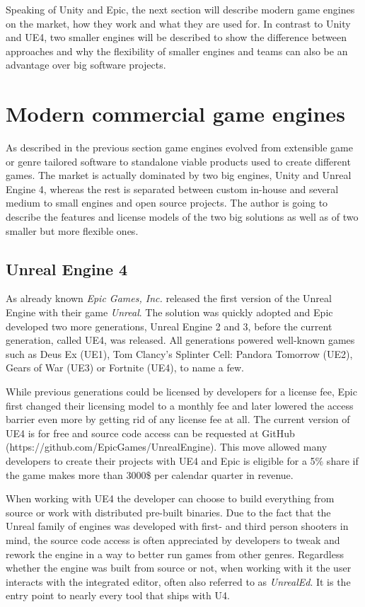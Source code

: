 Speaking of Unity and Epic, the next section will describe modern game engines on the market, how they work and what they are used for. In contrast to Unity and \acl{UE4}, two smaller engines will be described to show the difference between approaches and why the flexibility of smaller engines and teams can also be an advantage over big software projects.


\section{Modern commercial game engines}

As described in the previous section game engines evolved from extensible game or genre tailored software to standalone viable products used to create different games. The market is actually dominated by two big engines, Unity and Unreal Engine 4, whereas the rest is separated between custom in-house and several medium to small engines and open source projects. The author is going to describe the features and license models of the two big solutions as well as of two smaller but more flexible ones.

\subsection{Unreal Engine 4}

As already known \textit{Epic Games, Inc.} released the first version of the Unreal Engine with their game \textit{Unreal}. The solution was quickly adopted and Epic developed two more generations, Unreal Engine 2 and 3, before the current generation, called \ac{UE4}, was released. 
All generations powered well-known games such as Deus Ex (UE1), Tom Clancy’s Splinter Cell: Pandora Tomorrow (UE2), Gears of War (UE3) or Fortnite (UE4), to name a few.

While previous generations could be licensed by developers for a license fee, Epic first changed their licensing model to a monthly fee and later lowered the access barrier even more by getting rid of any license fee at all. The current version of \ac{UE4} is for free and source code access can be requested at GitHub (https://github.com/EpicGames/UnrealEngine). This move allowed many developers to create their projects with \ac{UE4} and Epic is eligible for a 5\% share if the game makes more than 3000\$ per calendar quarter in revenue.

When working with \ac{UE4} the developer can choose to build everything from source or work with distributed pre-built binaries. Due to the fact that the Unreal family of engines was developed with first- and third person shooters in mind, the source code access is often appreciated by developers to tweak and rework the engine in a way to better run games from other genres. Regardless whether the engine was built from source or not, when working with it the user interacts with the integrated editor, often also referred to as \textit{UnrealEd}. It is the entry point to nearly every tool that ships with \ac{U4}.

